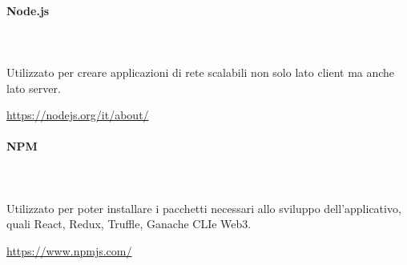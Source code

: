 		\paragraph{Node.js} \mbox{}\\ \mbox{}\\
		Utilizzato per creare applicazioni di rete scalabili non solo lato client ma anche lato server.\\
		\centerline{\url{https://nodejs.org/it/about/}}
		
		\paragraph{NPM} \mbox{}\\ \mbox{}\\
		Utilizzato per poter installare i pacchetti necessari allo sviluppo dell'applicativo, quali React\glo, Redux\glo, Truffle\glo, Ganache CLI\glosp e Web3\glo. \\
		\centerline{\url{https://www.npmjs.com/}}
		
